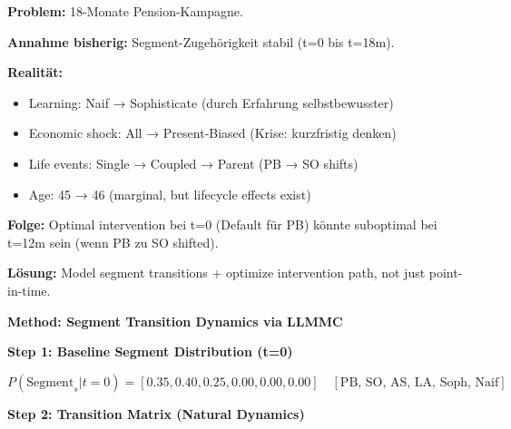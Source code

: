 \begin{tcolorbox}[colback=green!5!white, colframe=green!75!black, title=\textbf{Problem: Segmente ändern sich über Zeit}]

\textbf{Problem:} 18-Monate Pension-Kampagne.

\textbf{Annahme bisherig:} Segment-Zugehörigkeit stabil (t=0 bis t=18m).

\textbf{Realität:}
\begin{itemize}[nosep]
\item Learning: Naif → Sophisticate (durch Erfahrung selbstbewusster)
\item Economic shock: All → Present-Biased (Krise: kurzfristig denken)
\item Life events: Single → Coupled → Parent (PB → SO shifts)
\item Age: 45 → 46 (marginal, but lifecycle effects exist)
\end{itemize}

\textbf{Folge:} Optimal intervention bei t=0 (Default für PB) könnte suboptimal bei t=12m sein (wenn PB zu SO shifted).

\textbf{Lösung:} Model segment transitions + optimize intervention path, not just point-in-time.

\end{tcolorbox}

\textbf{Method: Segment Transition Dynamics via LLMMC}

\textbf{Step 1: Baseline Segment Distribution (t=0)}

\begin{equation}
P(\text{Segment}_s | t=0) = [0.35, 0.40, 0.25, 0.00, 0.00, 0.00] \quad [\text{PB, SO, AS, LA, Soph, Naif}]
\end{equation}

\textbf{Step 2: Transition Matrix (Natural Dynamics)}

